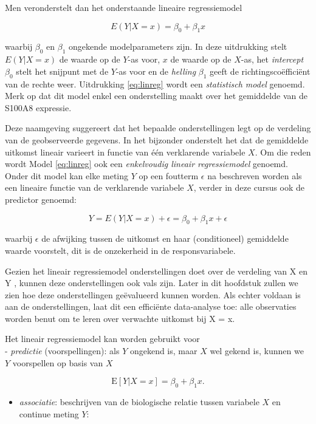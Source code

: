 \documentclass[
  12pt,dutch,coursenotes]{book}
\providecommand{\tightlist}{%
  \setlength{\itemsep}{0pt}\setlength{\parskip}{0pt}}
\theoremstyle{definition}
\theoremstyle{definition}
\theoremstyle{definition}
\theoremstyle{remark}
\begin{document}
Men veronderstelt dan het onderstaande lineaire regressiemodel

\begin{equation}
E(Y|X =x)=\beta_0 + \beta_1 x  \label{eq:linreg}
\end{equation}

waarbij \(\beta_0\) en \(\beta_1\) ongekende modelparameters zijn. In deze uitdrukking
stelt \(E(Y|X=x)\) de waarde op de \(Y\)-as voor, \(x\) de waarde op de \(X\)-as,
het \emph{intercept} \(\beta_0\) stelt het snijpunt met de \(Y\)-as voor en de
\emph{helling} \(\beta_1\) geeft de richtingscoëfficiënt van de rechte weer.
Uitdrukking \eqref{eq:linreg} wordt een \emph{statistisch model} genoemd.
Merk op dat dit model enkel een onderstelling maakt over het gemiddelde van de S100A8 expressie.

Deze naamgeving suggereert dat het bepaalde onderstellingen legt op de
verdeling van de geobserveerde gegevens. In het bijzonder onderstelt het dat
de gemiddelde uitkomst lineair varieert in functie van één verklarende variabele \(X\). Om
die reden wordt Model \eqref{eq:linreg} ook een \emph{enkelvoudig lineair regressiemodel} genoemd.
Onder dit model kan elke meting \(Y\) op een foutterm
\(\epsilon\) na beschreven worden als een lineaire functie van de verklarende
variabele \(X\), verder in deze cursus ook de predictor genoemd:

\[Y=E(Y|X=x)+\epsilon=\beta_0+\beta_1 x+\epsilon\]

waarbij \(\epsilon\) de afwijking tussen de uitkomst en haar (conditioneel)
gemiddelde waarde voorstelt, dit is de onzekerheid in de responsvariabele.

Gezien het lineair regressiemodel onderstellingen doet over de verdeling van X en Y , kunnen deze onderstellingen ook vals zijn. Later in dit hoofdstuk zullen we zien hoe deze onderstellingen geëvalueerd kunnen worden. Als echter voldaan is aan de onderstellingen, laat dit een efficiënte data-analyse toe: alle observaties worden benut om te leren over verwachte uitkomst bij X = x.

Het lineair regressiemodel kan worden gebruikt voor\\
- \emph{predictie} (voorspellingen): als \(Y\) ongekend is, maar \(X\) wel gekend is, kunnen we \(Y\) voorspellen op basis van \(X\)

\[\text{E}\left[Y|X =x\right]=\beta_0 + \beta_1 x.\]

\begin{itemize}
\tightlist
\item
  \emph{associatie}: beschrijven van de biologische relatie tussen variabele \(X\) en continue meting \(Y\):
\end{itemize}
\end{document}

